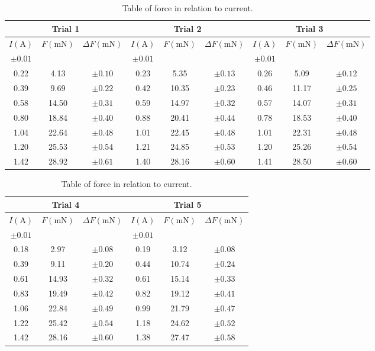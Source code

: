 \begin{table}[H]
	\centering
	\begin{tabular}{|ccc||ccc||ccc|}
		\hline
		\multicolumn{3}{|c||}{Trial 1} & \multicolumn{3}{c||}{Trial 2} & \multicolumn{3}{c|}{Trial 3} \\
		\hline
		$I(\si{\ampere})$ & $F(\si{\milli\newton})$ & $\Delta F(\si{\milli\newton})$ & $I(\si{\ampere})$ & $F(\si{\milli\newton})$ & $\Delta F(\si{\milli\newton})$ & $I(\si{\ampere})$ & $F(\si{\milli\newton})$ & $\Delta F(\si{\milli\newton})$ \\
		$\pm0.01$ & & & $\pm0.01$ & & & $\pm0.01$ & & \\
		\hline
		0.22 & 4.13 & $\pm0.10$ & 0.23 & 5.35 & $\pm0.13$ & 0.26 & 5.09 & $\pm0.12$ \\
		0.39 & 9.69 & $\pm0.22$ & 0.42 & 10.35 & $\pm0.23$ & 0.46 & 11.17 & $\pm0.25$ \\
		0.58 & 14.50 & $\pm0.31$ & 0.59 & 14.97 & $\pm0.32$ & 0.57 & 14.07 & $\pm0.31$ \\
		0.80 & 18.84 & $\pm0.40$ & 0.88 & 20.41 & $\pm0.44$ & 0.78 & 18.53 & $\pm0.40$ \\
		1.04 & 22.64 & $\pm0.48$ & 1.01 & 22.45 & $\pm0.48$ & 1.01 & 22.31 & $\pm0.48$ \\
		1.20 & 25.53 & $\pm0.54$ & 1.21 & 24.85 & $\pm0.53$ & 1.20 & 25.26 & $\pm0.54$ \\
		1.42 & 28.92 & $\pm0.61$ & 1.40 & 28.16 & $\pm0.60$ & 1.41 & 28.50 & $\pm0.60$\\
		\hline
	\end{tabular}
	\begin{tabular}{|ccc||ccc|}
		\hline
		\multicolumn{3}{|c||}{Trial 4} & \multicolumn{3}{c|}{Trial 5} \\
		\hline
		$I(\si{\ampere})$ & $F(\si{\milli\newton})$ & $\Delta F(\si{\milli\newton})$ & $I(\si{\ampere})$ & $F(\si{\milli\newton})$ & $\Delta F(\si{\milli\newton})$ \\
		$\pm0.01$ & & & $\pm0.01$ & & \\
		\hline
		0.18 & 2.97 & $\pm0.08$ & 0.19 & 3.12 & $\pm0.08$ \\
		0.39 & 9.11 & $\pm0.20$ & 0.44 & 10.74 & $\pm0.24$ \\
		0.61 & 14.93 & $\pm0.32$ & 0.61 & 15.14 & $\pm0.33$ \\
		0.83 & 19.49 & $\pm0.42$ & 0.82 & 19.12 & $\pm0.41$ \\
		1.06 & 22.84 & $\pm0.49$ & 0.99 & 21.79 & $\pm0.47$ \\
		1.22 & 25.42 & $\pm0.54$ & 1.18 & 24.62 & $\pm0.52$ \\
		1.42 & 28.16 & $\pm0.60$ & 1.38 & 27.47 & $\pm0.58$ \\
		\hline
	\end{tabular}
	\caption{Table of force in relation to current.}
	\vspace{-10pt}
	\label{tab:proc}
\end{table}

